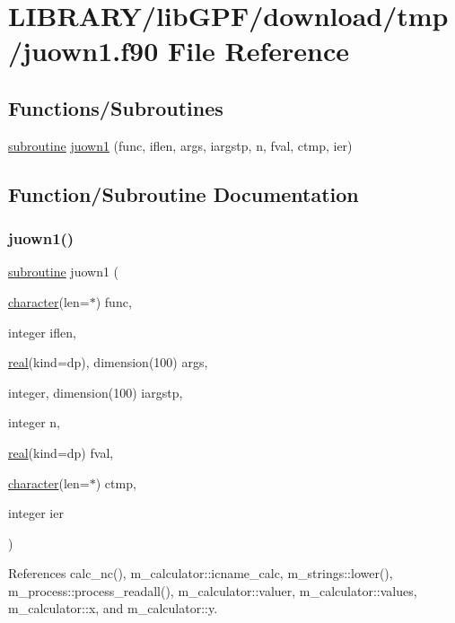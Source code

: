 \hypertarget{juown1_8f90}{}\section{L\+I\+B\+R\+A\+R\+Y/lib\+G\+P\+F/download/tmp/juown1.f90 File Reference}
\label{juown1_8f90}
\subsection*{Functions/\+Subroutines}
\begin{DoxyCompactItemize}
\item 
\hyperlink{M__stopwatch_83_8txt_acfbcff50169d691ff02d4a123ed70482}{subroutine} \hyperlink{juown1_8f90_a313c897cec3139ac9722b8f907c86495}{juown1} (func, iflen, args, iargstp, n, fval, ctmp, ier)
\end{DoxyCompactItemize}


\subsection{Function/\+Subroutine Documentation}
\mbox{\label{juown1_8f90_a313c897cec3139ac9722b8f907c86495}} 
\subsubsection{\texorpdfstring{juown1()}{juown1()}}
{\footnotesize\ttfamily \hyperlink{M__stopwatch_83_8txt_acfbcff50169d691ff02d4a123ed70482}{subroutine} juown1 (\begin{DoxyParamCaption}\item[{\hyperlink{option__stopwatch_83_8txt_abd4b21fbbd175834027b5224bfe97e66}{character}(len=$\ast$)}]{func,  }\item[{integer}]{iflen,  }\item[{\hyperlink{read__watch_83_8txt_abdb62bde002f38ef75f810d3a905a823}{real}(kind=dp), dimension(100)}]{args,  }\item[{integer, dimension(100)}]{iargstp,  }\item[{integer}]{n,  }\item[{\hyperlink{read__watch_83_8txt_abdb62bde002f38ef75f810d3a905a823}{real}(kind=dp)}]{fval,  }\item[{\hyperlink{option__stopwatch_83_8txt_abd4b21fbbd175834027b5224bfe97e66}{character}(len=$\ast$)}]{ctmp,  }\item[{integer}]{ier }\end{DoxyParamCaption})}



References calc\+\_\+nc(), m\+\_\+calculator\+::icname\+\_\+calc, m\+\_\+strings\+::lower(), m\+\_\+process\+::process\+\_\+readall(), m\+\_\+calculator\+::valuer, m\+\_\+calculator\+::values, m\+\_\+calculator\+::x, and m\+\_\+calculator\+::y.

